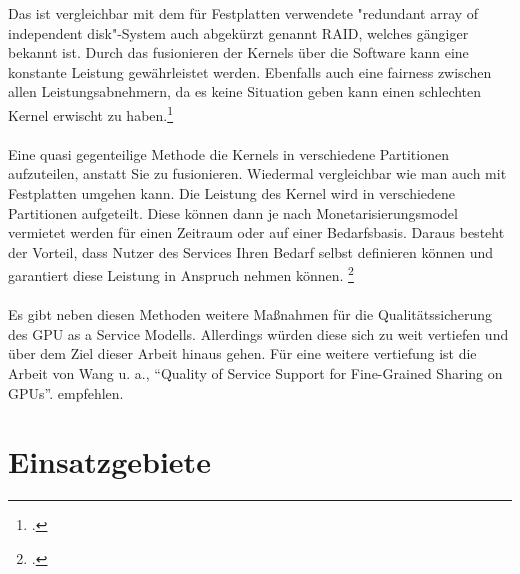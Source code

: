 \documentclass[12pt,toc=bib,toc=listof]{scrreprt}
\begin{document}
Das ist vergleichbar mit dem für Festplatten verwendete "redundant array of independent disk"-System auch abgekürzt genannt RAID, 
welches gängiger bekannt ist. Durch das fusionieren der Kernels über die Software kann eine 
konstante Leistung gewährleistet werden.
Ebenfalls auch eine fairness zwischen allen Leistungsabnehmern, da es keine Situation geben kann einen schlechten Kernel erwischt zu haben.\footcite [Vgl.] [] {Wang.2017}
\\ \\
Eine quasi gegenteilige Methode die Kernels in verschiedene Partitionen aufzuteilen, anstatt Sie zu fusionieren.
Wiedermal vergleichbar wie man auch mit Festplatten umgehen kann. Die Leistung des Kernel wird 
in verschiedene Partitionen aufgeteilt. Diese können dann je nach Monetarisierungsmodel 
vermietet werden für einen Zeitraum oder auf einer Bedarfsbasis. Daraus besteht der Vorteil, 
dass Nutzer des Services Ihren Bedarf selbst definieren können und garantiert diese Leistung 
in Anspruch nehmen können. \footcite [Vgl.] [] {Wang.2017}
\\ \\
Es gibt neben diesen Methoden weitere Maßnahmen für die Qualitätssicherung des GPU as a Service Modells. 
Allerdings würden diese sich zu weit vertiefen und über dem Ziel dieser Arbeit hinaus gehen. 
Für eine weitere vertiefung ist die Arbeit von Wang u. a., “Quality of Service Support for Fine-Grained Sharing on GPUs”. empfehlen.

\section{Einsatzgebiete}
\label{sec: Einsatzgebiete}

\end{document}
